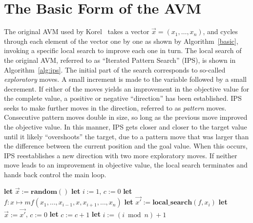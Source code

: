\documentclass{llncs}
\newcommand{\name}{AVM\hspace{-1pt}$f$\xspace}
\newcommand{\mf}{\mathit{mf}}
\begin{document}


\section{The Basic Form of the AVM}
\label{sec:basic}


The original AVM used by Korel~\cite{Korel1990} takes a vector $\vec{x} = (x_1, \dots, x_n)$, and cycles through each element of the vector one by one as shown by Algorithm~\ref{basic}, invoking a specific local search to improve each one in turn. The local search of the original AVM, referred to as ``Iterated Pattern Search'' (IPS), is shown in Algorithm~\ref{alg:ips}. The initial part of the search corresponds to so-called {\it exploratory} moves. A small increment is made to the variable followed by a small decrement. If either of the moves yields an improvement in the objective value for the complete value, a positive or negative ``direction'' has been established. IPS seeks to make further moves in the direction, referred to as {\it pattern} moves. Consecutive pattern moves double in size, so long as the previous move improved the objective value. In this manner, IPS gets closer and closer to the target value until it likely ``overshoots'' the target, due to a pattern move that was larger than the difference between the current position and the goal value. When this occurs, IPS reestablishes a new direction with two more exploratory moves. If neither move leads to an improvement in objective value, the local search terminates and hands back control the main loop.

\begin{algorithm}[b]
	\small
		\caption{The main loop of the AVM for optimizing $\vec{x} = (x_1, \dots, x_n)$ %
		}
	\begin{algorithmic}[1]
			\STATE \textbf{let} $\vec{x}:=\mathbf{random}()$
			\STATE \textbf{let} $i:=1$, $c:=0$
				\STATE \textbf{let} $f \colon x \mapsto \mf(x_1, \dots, x_{i-1}, x, x_{i+1}, \dots, x_n)$
				\STATE \textbf{let} $\vec{x'}:=\mathbf{local\_search}(f,x_i)$
				 \IF{$\mf(\vec{x'})<\mf(\vec{x})$}
					\STATE \textbf{let} $\vec{x}:=\vec{x'}$, $c:=0$
				\ELSE
					\STATE \textbf{let} $c:=c+1$
				\ENDIF
				\STATE \textbf{let} $i:= (i \bmod n) +1$
			\ENDWHILE
		\ENDWHILE
	\end{algorithmic}
	\label{alg:basic}
\end{algorithm}
\end{document}
